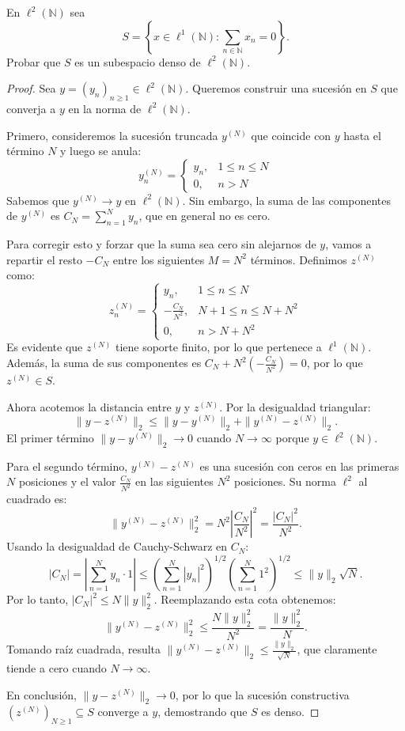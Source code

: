 \documentclass{article}
\theoremstyle{definition}
\newcommand{\N}{\mathbb{N}}
\newenvironment{ejercicio}[1]{\begin{trivlist}
\item[\hskip \labelsep {\bfseries Ejercicio}\hskip \labelsep {\bfseries #1.}]}{\end{trivlist}}
\begin{document}
\begin{ejercicio}{9}
	En \( \ell^2(\N) \) sea
	\[ S = \left \{ x \in \ell^1(\N) : \sum_{n \in \N} x_n = 0 \right \}. \]
	Probar que \( S \) es un subespacio denso de \( \ell^2(\N) \).
\end{ejercicio}
\begin{proof}
	Sea \( y = {(y_n)}_{n \ge 1} \in \ell^2(\N) \). Queremos construir una sucesión en \( S \) que converja a \( y \) en la norma de \( \ell^2(\N) \).

	Primero, consideremos la sucesión truncada \( y^{(N)} \) que coincide con \( y \) hasta el término \( N \) y luego se anula:
	\[
		y^{(N)}_n = \begin{cases} y_n, & 1 \le n \le N \\ 0, & n > N \end{cases}
	\]
	Sabemos que \( y^{(N)} \to y \) en \( \ell^2(\N) \). Sin embargo, la suma de las componentes de \( y^{(N)} \) es \( C_N = \sum_{n=1}^N y_n \), que en general no es cero.

	Para corregir esto y forzar que la suma sea cero sin alejarnos de \( y \), vamos a repartir el resto \( -C_N \) entre los siguientes \( M = N^2 \) términos. Definimos \( z^{(N)} \) como:
	\[
		z^{(N)}_n =
		\begin{cases}
			y_n,              & 1 \le n \le N       \\
			-\frac{C_N}{N^2}, & N+1 \le n \le N+N^2 \\
			0,                & n > N+N^2
		\end{cases}
	\]
	Es evidente que \( z^{(N)} \) tiene soporte finito, por lo que pertenece a \( \ell^1(\N) \). Además, la suma de sus componentes es \( C_N + N^2 \left( -\frac{C_N}{N^2} \right) = 0 \), por lo que \( z^{(N)} \in S \).

	Ahora acotemos la distancia entre \( y \) y \( z^{(N)} \). Por la desigualdad triangular:
	\[
		\|y - z^{(N)}\|_2 \le \|y - y^{(N)}\|_2 + \|y^{(N)} - z^{(N)}\|_2.
	\]
	El primer término \( \|y - y^{(N)}\|_2 \to 0 \) cuando \( N \to \infty \) porque \( y \in \ell^2(\N) \).

	Para el segundo término, \( y^{(N)} - z^{(N)} \) es una sucesión con ceros en las primeras \( N \) posiciones y el valor \( \frac{C_N}{N^2} \) en las siguientes \( N^2 \) posiciones. Su norma \( \ell^2 \) al cuadrado es:
	\[
		\|y^{(N)} - z^{(N)}\|_2^2 = N^2 \left| \frac{C_N}{N^2} \right|^2 = \frac{|C_N|^2}{N^2}.
	\]
	Usando la desigualdad de Cauchy-Schwarz en \( C_N \):
	\[
		|C_N| = \left| \sum_{n=1}^N y_n \cdot 1 \right| \le {\left( \sum_{n=1}^N |y_n|^2 \right)}^{1/2} {\left( \sum_{n=1}^N 1^2 \right)}^{1/2} \le \|y\|_2 \sqrt{N}.
	\]
	Por lo tanto, \( |C_N|^2 \le N \|y\|_2^2 \). Reemplazando esta cota obtenemos:
	\[
		\|y^{(N)} - z^{(N)}\|_2^2 \le \frac{N \|y\|_2^2}{N^2} = \frac{\|y\|_2^2}{N}.
	\]
	Tomando raíz cuadrada, resulta \( \|y^{(N)} - z^{(N)}\|_2 \le \frac{\|y\|_2}{\sqrt{N}} \), que claramente tiende a cero cuando \( N \to \infty \).

	En conclusión, \( \|y - z^{(N)}\|_2 \to 0 \), por lo que la sucesión constructiva \( {(z^{(N)})}_{N \ge 1} \subseteq S \) converge a \( y \), demostrando que \( S \) es denso.
\end{proof}
\end{document}
